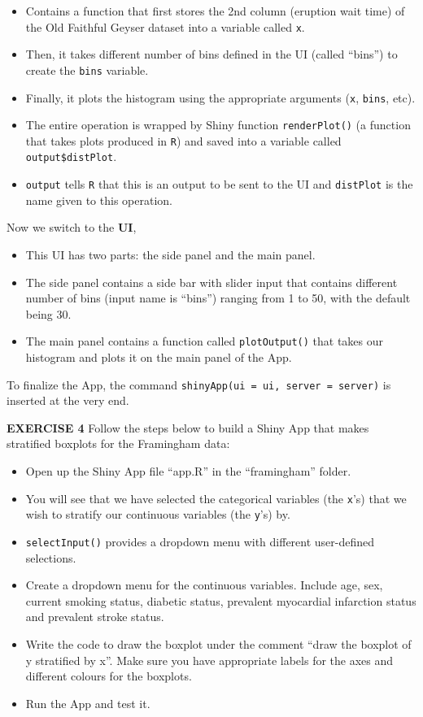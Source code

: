 \documentclass[
]{article}
\begin{document}
\begin{itemize}
\item
  Contains a function that first stores the 2nd column (eruption wait
  time) of the Old Faithful Geyser dataset into a variable called
  \texttt{x}.
\item
  Then, it takes different number of bins defined in the UI (called
  ``bins'') to create the \texttt{bins} variable.
\item
  Finally, it plots the histogram using the appropriate arguments
  (\texttt{x}, \texttt{bins}, etc).
\item
  The entire operation is wrapped by Shiny function
  \texttt{renderPlot()} (a function that takes plots produced in
  \texttt{R}) and saved into a variable called
  \texttt{output\$distPlot}.
\item
  \texttt{output} tells \texttt{R} that this is an output to be sent to
  the UI and \texttt{distPlot} is the name given to this operation.
\end{itemize}

Now we switch to the \textbf{UI},

\begin{itemize}
\item
  This UI has two parts: the side panel and the main panel.
\item
  The side panel contains a side bar with slider input that contains
  different number of bins (input name is ``bins'') ranging from 1 to
  50, with the default being 30.
\item
  The main panel contains a function called \texttt{plotOutput()} that
  takes our histogram and plots it on the main panel of the App.
\end{itemize}

To finalize the App, the command
\texttt{shinyApp(ui\ =\ ui,\ server\ =\ server)} is inserted at the very
end.

\textbf{EXERCISE 4} Follow the steps below to build a Shiny App that
makes stratified boxplots for the Framingham data:

\begin{itemize}
\item
  Open up the Shiny App file ``app.R'' in the ``framingham'' folder.
\item
  You will see that we have selected the categorical variables (the
  \texttt{x}'s) that we wish to stratify our continuous variables (the
  \texttt{y}'s) by.
\item
  \texttt{selectInput()} provides a dropdown menu with different
  user-defined selections.
\item
  Create a dropdown menu for the continuous variables. Include age, sex,
  current smoking status, diabetic status, prevalent myocardial
  infarction status and prevalent stroke status.
\item
  Write the code to draw the boxplot under the comment ``draw the
  boxplot of y stratified by x''. Make sure you have appropriate labels
  for the axes and different colours for the boxplots.
\item
  Run the App and test it.
\end{itemize}
\end{document}
